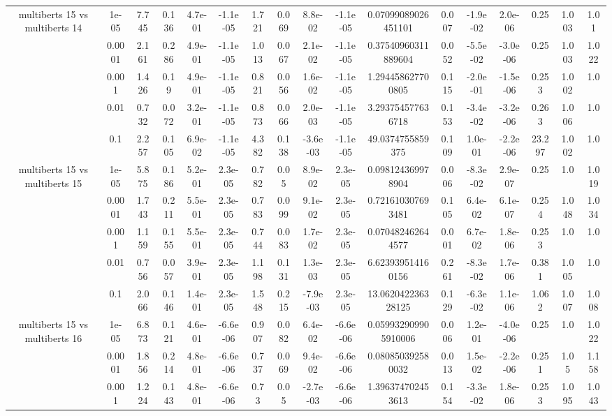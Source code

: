 \begin{tabular}{|c|c|c|c|c|c|c|c|c|c|c|c|c|c|c|c|c|}
\hline
\multirow{5}{*}{multiberts 15 vs multiberts 14} & 1e-05 & 7.745 & 0.136 & 4.7e-01 & -1.1e-05 & 1.721 & 0.069 & 8.8e-02 & -1.1e-05 & 0.07099089026451101 & 0.007 & -1.9e-02 & 2.0e-06 & 0.25 & 1.003 & 1.01 \\
 & 0.0001 & 2.161 & 0.286 & 4.9e-01 & -1.1e-05 & 1.013 & 0.067 & 2.1e-02 & -1.1e-05 & 0.37540960311889604 & 0.052 & -5.5e-02 & -3.0e-06 & 0.25 & 1.003 & 1.022 \\
 & 0.001 & 1.426 & 0.19 & 4.9e-01 & -1.1e-05 & 0.821 & 0.056 & 1.6e-02 & -1.1e-05 & 1.294458627700805 & 0.115 & -2.0e-01 & -1.5e-06 & 0.253 & 1.002 & 1.0 \\
 & 0.01 & 0.732 & 0.072 & 3.2e-01 & -1.1e-05 & 0.873 & 0.066 & 2.0e-03 & -1.1e-05 & 3.293754577636718 & 0.153 & -3.4e-02 & -3.2e-06 & 0.263 & 1.006 & 1.0 \\
 & 0.1 & 2.257 & 0.105 & 6.9e-02 & -1.1e-05 & 4.382 & 0.138 & -3.6e-03 & -1.1e-05 & 49.0374755859375 & 0.109 & 1.0e-01 & -2.2e-06 & 23.297 & 1.002 & 1.0 \\
\hline
\multirow{5}{*}{multiberts 15 vs multiberts 15} & 1e-05 & 5.875 & 0.186 & 5.2e-01 & 2.3e-05 & 0.782 & 0.05 & 8.9e-02 & 2.3e-05 & 0.098124369978904 & 0.006 & -8.3e-02 & 2.9e-07 & 0.25 & 1.0 & 1.019 \\
 & 0.0001 & 1.743 & 0.211 & 5.5e-01 & 2.3e-05 & 0.783 & 0.099 & 9.1e-02 & 2.3e-05 & 0.721610307693481 & 0.105 & 6.4e-02 & 6.1e-07 & 0.254 & 1.048 & 1.034 \\
 & 0.001 & 1.159 & 0.155 & 5.5e-01 & 2.3e-05 & 0.744 & 0.083 & 1.7e-02 & 2.3e-05 & 0.070482462644577 & 0.001 & 6.7e-02 & 1.8e-06 & 0.253 & 1.0 & 1.0 \\
 & 0.01 & 0.756 & 0.057 & 3.9e-01 & 2.3e-05 & 1.198 & 0.131 & 1.3e-03 & 2.3e-05 & 6.623939514160156 & 0.261 & -8.3e-02 & 1.7e-06 & 0.381 & 1.005 & 1.0 \\
 & 0.1 & 2.066 & 0.146 & 1.4e-01 & 2.3e-05 & 1.548 & 0.215 & -7.9e-03 & 2.3e-05 & 13.062042236328125 & 0.129 & -6.3e-02 & 1.1e-06 & 1.062 & 1.007 & 1.008 \\
\hline
\multirow{5}{*}{multiberts 15 vs multiberts 16} & 1e-05 & 6.873 & 0.121 & 4.6e-01 & -6.6e-06 & 0.907 & 0.082 & 6.4e-02 & -6.6e-06 & 0.059932909905910006 & 0.006 & 1.2e-01 & -4.0e-06 & 0.25 & 1.0 & 1.022 \\
 & 0.0001 & 1.856 & 0.214 & 4.8e-01 & -6.6e-06 & 0.737 & 0.069 & 9.4e-02 & -6.6e-06 & 0.080850392580032 & 0.013 & 1.5e-02 & -2.2e-06 & 0.251 & 1.05 & 1.158 \\
 & 0.001 & 1.224 & 0.143 & 4.8e-01 & -6.6e-06 & 0.73 & 0.05 & -2.7e-03 & -6.6e-06 & 1.396374702453613 & 0.154 & -3.3e-02 & 1.8e-06 & 0.253 & 1.095 & 1.043 \\

\end{tabular}
